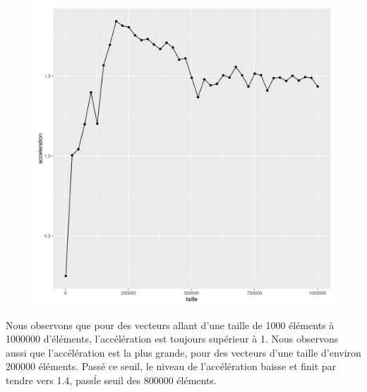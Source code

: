 \documentclass[a4paper,11pt]{scrartcl}
\begin{document}
\begin{figure}[H] \center
   \includegraphics[scale=0.5] {graphes/global_temps_machine_accel8.png}
\end{figure}

Nous observons que pour des vecteurs allant d'une taille de 1000 \'el\'ements \`a 1000000 d'\'el\'ements, l'acc\'el\'eration est toujours sup\'erieur \`a 1. Nous observons aussi que l'acc\'el\'eration est la plus grande, pour des vecteurs d'une taille d'environ 200000 \'el\'ements. Pass\'e ce seuil, le niveau de l'acc\'el\'eration baisse et finit par tendre vers 1.4, pass\' le seuil des 800000 \'el\'ements.   
\end{document}
